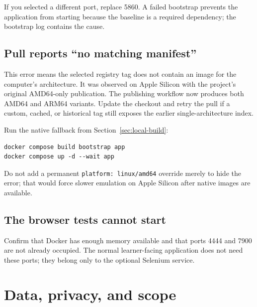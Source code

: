 \documentclass[11pt,a4paper]{article}
\begin{document}
If you selected a different port, replace 5860. A failed bootstrap prevents
the application from starting because the baseline is a required dependency;
the bootstrap log contains the cause.

\subsection{Pull reports ``no matching manifest''}

This error means the selected registry tag does not contain an image for the
computer's architecture. It was observed on Apple Silicon with the project's
original AMD64-only publication. The publishing workflow now produces both
AMD64 and ARM64 variants. Update the checkout and retry the pull if a custom,
cached, or historical tag still exposes the earlier single-architecture index.

Run the native fallback from Section~\ref{sec:local-build}:

\begin{lstlisting}[style=terminal]
docker compose build bootstrap app
docker compose up -d --wait app
\end{lstlisting}

Do not add a permanent \texttt{platform: linux/amd64} override merely to hide
the error; that would force slower emulation on Apple Silicon after native
images are available.

\subsection{The browser tests cannot start}

Confirm that Docker has enough memory available and that ports 4444 and 7900
are not already occupied. The normal learner-facing application does not need
these ports; they belong only to the optional Selenium service.

\section{Data, privacy, and scope}
\end{document}
